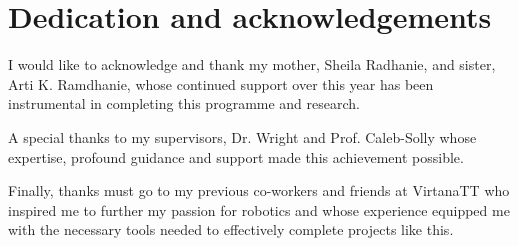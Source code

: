 %
%

\chapter*{Dedication and acknowledgements}
\begin{SingleSpace}
    I would like to acknowledge and thank my mother, Sheila Radhanie, and sister, Arti K. Ramdhanie, whose continued support over this year has been instrumental in completing this programme and research.

    A special thanks to my supervisors, Dr. Wright and Prof. Caleb-Solly whose expertise, profound guidance and support made this achievement possible.

    Finally, thanks must go to my previous co-workers and friends at VirtanaTT who inspired me to further my passion for robotics and whose experience equipped me with the necessary tools needed to effectively complete projects like this.
\end{SingleSpace}
\clearpage